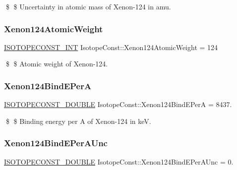 \$ \$ Uncertainty in atomic mass of Xenon-\/124 in amu. \mbox{\label{group___isotope_const-_xenon-_xe124_ga8fc76b5b8d25dd909ad20d68f76e2492}} 
\subsubsection{\texorpdfstring{Xenon124\+Atomic\+Weight}{Xenon124AtomicWeight}}
{\footnotesize\ttfamily \mbox{\hyperlink{group___isotope_const-_macros_ga5f18360b3e99483a35c32d789e62621c}{I\+S\+O\+T\+O\+P\+E\+C\+O\+N\+S\+T\+\_\+\+I\+NT}} Isotope\+Const\+::\+Xenon124\+Atomic\+Weight = 124}

\$ \$ Atomic weight of Xenon-\/124. \mbox{\label{group___isotope_const-_xenon-_xe124_gaafc5c6820a7c26827a8e90592a9a5095}} 
\subsubsection{\texorpdfstring{Xenon124\+Bind\+E\+PerA}{Xenon124BindEPerA}}
{\footnotesize\ttfamily \mbox{\hyperlink{group___isotope_const-_macros_ga8f45a7272ce02c0b4c65c44636ed719a}{I\+S\+O\+T\+O\+P\+E\+C\+O\+N\+S\+T\+\_\+\+D\+O\+U\+B\+LE}} Isotope\+Const\+::\+Xenon124\+Bind\+E\+PerA = 8437.}

\$ \$ Binding energy per A of Xenon-\/124 in keV. \mbox{\label{group___isotope_const-_xenon-_xe124_ga6b62a930a6ea40053816a83197a7d6b5}} 
\subsubsection{\texorpdfstring{Xenon124\+Bind\+E\+Per\+A\+Unc}{Xenon124BindEPerAUnc}}
{\footnotesize\ttfamily \mbox{\hyperlink{group___isotope_const-_macros_ga8f45a7272ce02c0b4c65c44636ed719a}{I\+S\+O\+T\+O\+P\+E\+C\+O\+N\+S\+T\+\_\+\+D\+O\+U\+B\+LE}} Isotope\+Const\+::\+Xenon124\+Bind\+E\+Per\+A\+Unc = 0.}

